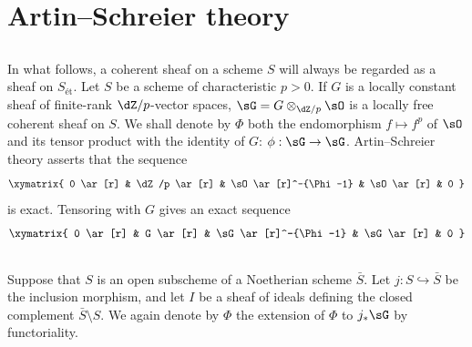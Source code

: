 \documentclass[oneside]{book}
\begin{document}
\section{Artin--Schreier theory}\label{III:3}






\subsection{}\label{III:3-1}

In what follows, a coherent sheaf on a scheme $S$ will always be regarded as
a sheaf on $S_\text{ét}$. Let $S$ be a scheme of characteristic $p>0$. If
$G$ is a locally constant sheaf of finite-rank $\dZ/p$-vector spaces,
$\sG=G\otimes_{\dZ/p}\sO$ is a locally free coherent sheaf on $S$. We shall
denote by $\Phi$ both the endomorphism $f\mapsto f^p$ of $\sO$ and its tensor
product with the identity of $G$: $\phi:\sG\to\sG$. Artin--Schreier theory
\cite[IX 3.5]{sga4} asserts that the sequence
\[\xymatrix{
  0 \ar[r]
    & \dZ/p \ar[r]
    & \sO \ar[r]^-{\Phi-1}
    & \sO \ar[r]
    & 0
}\]
is exact. Tensoring with $G$ gives an exact sequence
\[\xymatrix{
  0 \ar[r]
    & G \ar[r]
    & \sG \ar[r]^-{\Phi-1}
    & \sG \ar[r]
    & 0
}\]






\subsection{}\label{III:3-2}

Suppose that $S$ is an open subscheme of a Noetherian scheme $\bar S$. Let
$j:S\hookrightarrow \bar S$ be the inclusion morphism, and let $I$ be a
sheaf of ideals defining the closed complement $\bar S\setminus S$. We again
denote by $\Phi$ the extension of $\Phi$ to $j_*\sG$ by functoriality.
\end{document}
